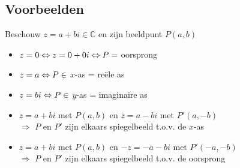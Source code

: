 \documentclass[12pt,twoside,a4paper]{article}
\begin{document}
\subsection{Voorbeelden}

Beschouw $z=a+bi\in\mathbb{C}$ en zijn beeldpunt $P(a,b)$

\begin{itemize}
  \item $z=0 \Leftrightarrow z=0+0i \Leftrightarrow P=$ oorsprong
  \item $z=a \Leftrightarrow P\in $ $x$-as = reële as
  \item $z=bi \Leftrightarrow P\in $ $y$-as = imaginaire as
  \item $z=a+bi \text{ met } P(a,b)$ en $\overline{z}=a-bi \text{ met } P'(a,-b)$\\
  $\Rightarrow$ $P$ en $P'$ zijn elkaars spiegelbeeld t.o.v. de $x$-as
  \item $z=a+bi \text{ met } P(a,b)$ en $-z=-a-bi \text{ met } P'(-a,-b)$\\
  $\Rightarrow$ $P$ en $P'$ zijn elkaars spiegelbeeld t.o.v. de oorsprong
\end{itemize}
\end{document}
